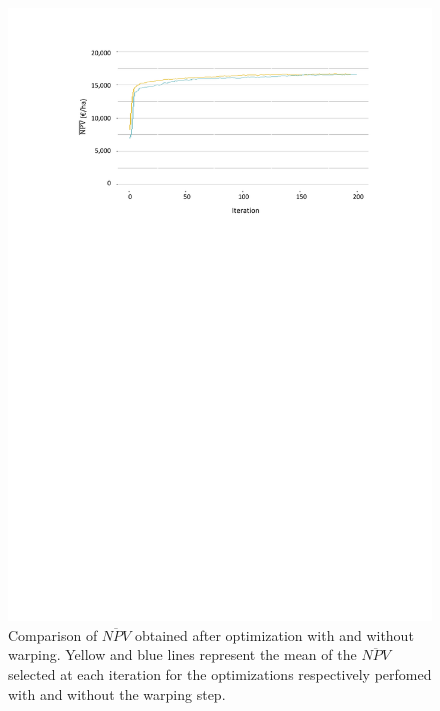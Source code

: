 \begin{figure}[!ht]
	\centering
	\includegraphics[trim = 2cm 15cm 5cm 1cm, clip]{Figures_Warping_resultats_courbes_moyennes_mean_NPV_warping_sanswarping.pdf}
	\caption{Comparison of $\overline{NPV}$ obtained after optimization with and without warping. Yellow and blue lines represent the mean of the $\overline{NPV}$ selected at each iteration for the optimizations respectively perfomed with and without the warping step. }\label{fig:moyennesNPV}
\end{figure}

